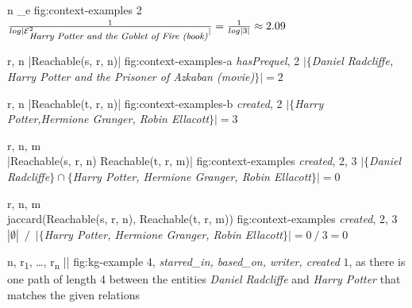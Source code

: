 {n}
{\sum_{e \in {} \cap {}}{}}
{fig:context-examples}
{2}
{$\frac{1}{log |\mathcal{E}{}_{\textit{\footnotesize Harry Potter and the Goblet of Fire (book)}}^{2}|} = \frac{1}{log |3|} \approx 2.09$}

{r, n}
{|Reachable(s, r, n)|}
{fig:context-examples-a}
{\textit{hasPrequel}, 2}
{$|\{$\textit{Daniel Radcliffe, Harry Potter and the Prisoner of Azkaban (movie)}$\}| = 2$}

{r, n}
{|Reachable(t, r, n)|}
{fig:context-examples-b}
{\textit{created}, 2}
{$|\{$\textit{Harry Potter,Hermione Granger, Robin Ellacott}$\}| = 3$}

{r, n, m}
{\\|Reachable(s, r, n) \cap Reachable(t, r, m)|}
{fig:context-examples}
{\textit{created}, 2, 3}
{$|\{$\textit{Daniel Radcliffe}$\} \cap \{$\textit{Harry Potter, Hermione Granger, Robin Ellacott}$\}| = 0$}

{r, n, m}
{\\jaccard(Reachable(s, r, n), Reachable(t, r, m))}
{fig:context-examples}
{\textit{created}, 2, 3}
{$|\emptyset|$~$/$~$|\{$\textit{Harry Potter, Hermione Granger, Robin Ellacott}$\}| = 0~/~3 = 0$}


{n, r\textsubscript{1}, \ldots, r\textsubscript{n}}
{||}
{fig:kg-example}
{4, \textit{starred\_in, based\_on, writer, created}}
{$1$, as there is one path of length 4 between the entities \textit{Daniel Radcliffe} and \textit{Harry Potter} that matches the given relations}

